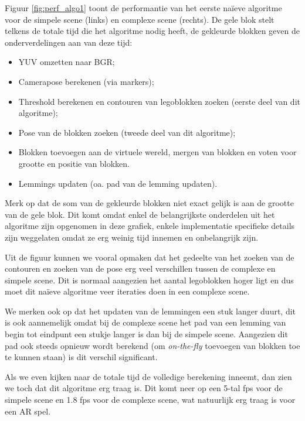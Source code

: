 Figuur \ref{fig:perf_algo1} toont de performantie van het eerste na\"ieve algoritme voor de simpele scene (links) en complexe scene (rechts). De gele blok stelt telkens de totale tijd die het algoritme nodig heeft, de gekleurde blokken geven de onderverdelingen aan van deze tijd: 
\begin{itemize}
\item YUV omzetten naar BGR;
\item Camerapose berekenen (via markers);
\item Threshold berekenen en contouren van legoblokken zoeken (eerste deel van dit algoritme);
\item Pose van de blokken zoeken (tweede deel van dit algoritme);
\item Blokken toevoegen aan de virtuele wereld, mergen van blokken en voten voor grootte en positie van blokken.
\item Lemmings updaten (oa. pad van de lemming updaten).
\end{itemize}
Merk op dat de som van de gekleurde blokken niet exact gelijk is aan de grootte van de gele blok. Dit komt omdat enkel de belangrijkste onderdelen uit het algoritme zijn opgenomen in deze grafiek, enkele implementatie specifieke details zijn weggelaten omdat ze erg weinig tijd innemen en onbelangrijk zijn.

Uit de figuur kunnen we vooral opmaken dat het gedeelte van het zoeken van de contouren en zoeken van de pose erg veel verschillen tussen de complexe en simpele scene. Dit is normaal aangezien het aantal legoblokken hoger ligt en dus moet dit na\"ieve algoritme veer iteraties doen in een complexe scene.

We merken ook op dat het updaten van de lemmingen een stuk langer duurt, dit is ook aannemelijk omdat bij de complexe scene het pad van een lemming van begin tot eindpunt een stukje langer is dan bij de simpele scene. Aangezien dit pad ook steeds opnieuw wordt berekend (om \textit{on-the-fly} toevoegen van blokken toe te kunnen staan) is dit verschil significant.

Als we even kijken naar de totale tijd de volledige berekening inneemt, dan zien we toch dat dit algoritme erg traag is. Dit komt neer op een 5-tal fps voor de simpele scene en 1.8 fps voor de complexe scene, wat natuurlijk erg traag is voor een AR spel.

